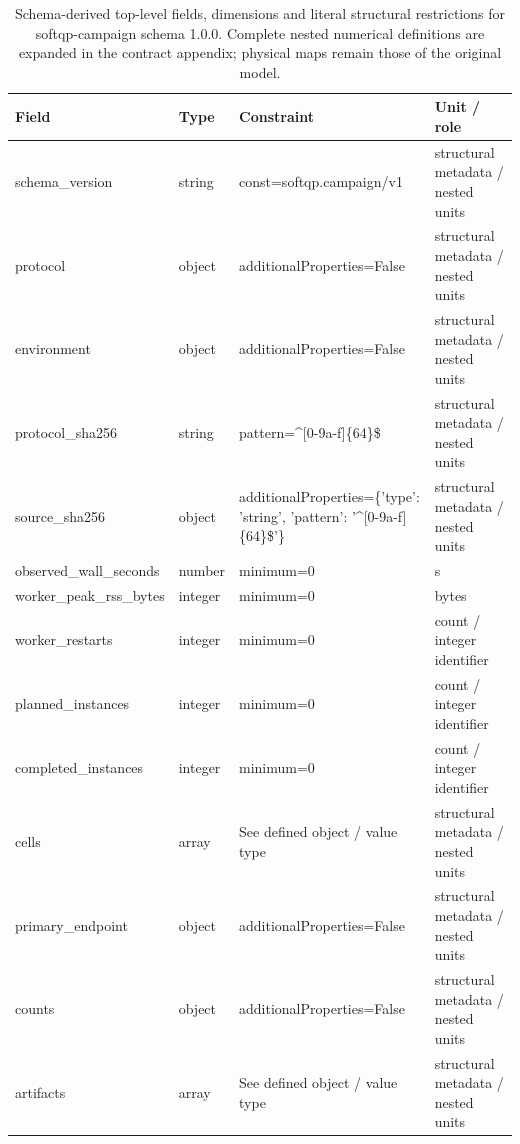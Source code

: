 \begin{table}[htbp]\centering\footnotesize
\caption{Schema-derived top-level fields, dimensions and literal structural restrictions for softqp-campaign schema 1.0.0. Complete nested numerical definitions are expanded in the contract appendix; physical maps remain those of the original model.}\label{tab:contract-softqp-campaign} %
\begin{tabularx}{\textwidth}{@{}>{\raggedright\arraybackslash}p{}>{\raggedright\arraybackslash}p{}>{\raggedright\arraybackslash}X>{\raggedright\arraybackslash}X@{}}\toprule
Field & Type & Constraint & Unit / role\\\midrule
schema\_\allowbreak{}version & string & const=\allowbreak{}softqp.\allowbreak{}campaign/\allowbreak{}v1 & structural metadata /\allowbreak{} nested units\\ %
protocol & object & additionalProperties=\allowbreak{}False & structural metadata /\allowbreak{} nested units\\
environment & object & additionalProperties=\allowbreak{}False & structural metadata /\allowbreak{} nested units\\
protocol\_\allowbreak{}sha256 & string & pattern=\allowbreak{}\textasciicircum{}[0-9a-\allowbreak{}f]\{64\}\$ & structural metadata /\allowbreak{} nested units\\
source\_\allowbreak{}sha256 & object & additionalProperties=\allowbreak{}\{'type': 'string', 'pattern': '\textasciicircum{}[0-9a-\allowbreak{}f]\{64\}\$'\} & structural metadata /\allowbreak{} nested units\\
observed\_\allowbreak{}wall\_\allowbreak{}seconds & number & minimum=\allowbreak{}0 & s\\
worker\_\allowbreak{}peak\_\allowbreak{}rss\_\allowbreak{}bytes & integer & minimum=\allowbreak{}0 & bytes\\
worker\_\allowbreak{}restarts & integer & minimum=\allowbreak{}0 & count /\allowbreak{} integer identifier\\
planned\_\allowbreak{}instances & integer & minimum=\allowbreak{}0 & count /\allowbreak{} integer identifier\\
completed\_\allowbreak{}instances & integer & minimum=\allowbreak{}0 & count /\allowbreak{} integer identifier\\
cells & array & See defined object /\allowbreak{} value type & structural metadata /\allowbreak{} nested units\\
primary\_\allowbreak{}endpoint & object & additionalProperties=\allowbreak{}False & structural metadata /\allowbreak{} nested units\\
counts & object & additionalProperties=\allowbreak{}False & structural metadata /\allowbreak{} nested units\\
artifacts & array & See defined object /\allowbreak{} value type & structural metadata /\allowbreak{} nested units\\
\bottomrule\end{tabularx}
\end{table}

